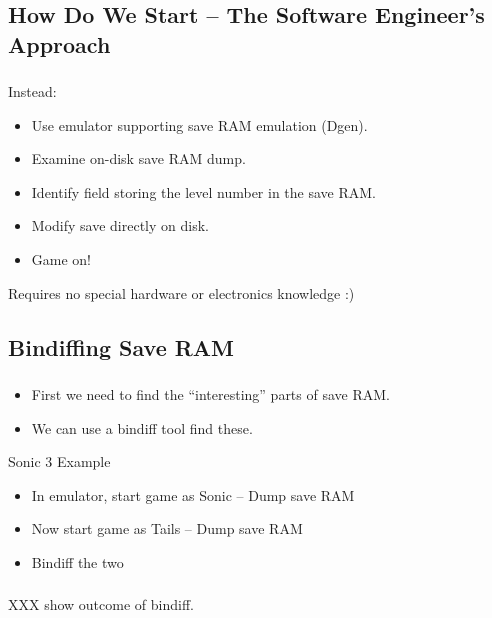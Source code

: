 \documentclass{beamer}
\begin{document}

\subsection{How Do We Start -- The Software Engineer's Approach}
\begin{frame}[fragile]
\frametitle{\insertsubsection}

Instead:

\begin{itemize}
\item Use emulator supporting save RAM emulation (Dgen).
\item Examine on-disk save RAM dump.
\item Identify field storing the level number in the save RAM.
\item Modify save directly on disk.
\item Game on!
\end{itemize}

\vfill

Requires no special hardware or electronics knowledge :)

\end{frame}


\subsection{Bindiffing Save RAM}

\begin{frame}[fragile]
\frametitle{\insertsubsection}

\begin{itemize}
\item First we need to find the ``interesting'' parts of save RAM.
\item We can use a bindiff tool find these.
\end{itemize}

\vfill

\begin{block}{Sonic 3 Example}
\begin{itemize}
\item In emulator, start game as Sonic -- Dump save RAM
\item Now start game as Tails -- Dump save RAM
\item Bindiff the two
\end{itemize}
\end{block}

\end{frame}


\begin{frame}[fragile]
\frametitle{\insertsubsection}

XXX show outcome of bindiff.

\end{frame}


\end{document}
